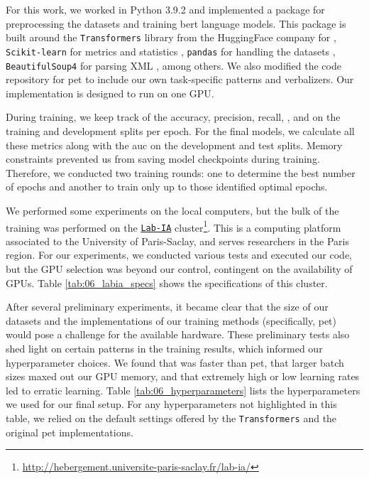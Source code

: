 \label{06_implementation_and_hardware}

For this work, we worked in Python 3.9.2 and implemented a package for preprocessing the datasets and training \gls{bert} language models. This package is built around the \texttt{Transformers} library from the  HuggingFace company  for \finetuning{} , \texttt{Scikit-learn} for metrics and statistics , \texttt{pandas} for handling the datasets , \texttt{BeautifulSoup4} for parsing XML , among others. We also modified the code repository for \gls{pet} to include our own task-specific patterns and verbalizers.  Our implementation is designed to run on one GPU.






During training, we keep track of the accuracy, precision, recall, \fOne{}, and \fTwo{} on the training and development splits per epoch. For the final models, we calculate all these metrics along with the \gls{auc} on the development and test splits. Memory constraints prevented us from saving model checkpoints during training. Therefore, we conducted two training rounds: one to determine the best number of epochs and another to train only up to those identified optimal epochs.



We performed some experiments on the \MAIAGE{} local computers, but the bulk of the training was performed on the \href{http://hebergement.universite-paris-saclay.fr/lab-ia/}{\texttt{Lab-IA}} cluster\footnote{\url{http://hebergement.universite-paris-saclay.fr/lab-ia/}}. This is a computing platform associated to the University of Paris-Saclay, and serves researchers in the Paris region. For our experiments, we conducted various tests and executed our code, but the GPU selection was beyond our control, contingent on the availability of GPUs. Table \ref{tab:06_labia_specs} shows the specifications of this cluster.




After several preliminary experiments, it became clear that the size of our datasets and the implementations of our training methods (specifically, \gls{pet}) would pose a challenge for the available hardware. 
These preliminary tests also shed light on certain patterns in the training results, which informed our hyperparameter choices.
We found that \finetuning{} was faster than \gls{pet}, that larger batch sizes maxed out our GPU memory, and that extremely high or low learning rates led to erratic learning.
Table \ref{tab:06_hyperparameters} lists the hyperparameters we used for our final setup.
For any hyperparameters not highlighted in this table, we relied on the default settings offered by the \texttt{Transformers} and the original \gls{pet} implementations.









